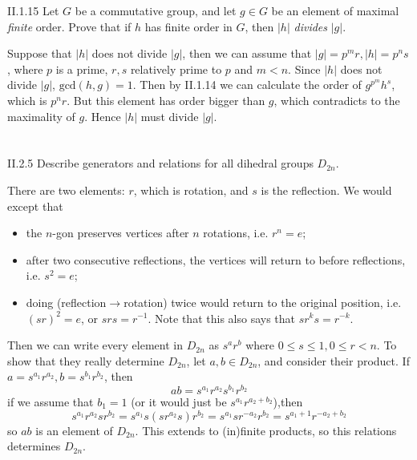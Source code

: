 \begin{problem}{II.1.15}
Let $G$ be a commutative group, and let $g\in G$ be an element of maximal \emph{finite} order. Prove that if $h$ has finite order in $G$, then $|h|$ \emph{divides} $|g|$.
\end{problem}
\begin{pf}
Suppose that $|h|$ does not divide $|g|$, then we can assume that $|g| = p^mr, |h| = p^ns$, where $p$ is a prime, $r, s$ relatively prime to $p$ and $m<n$. Since $|h|$ does not divide $|g|$, $\text{gcd}(h,g) = 1$. Then by II.1.14 we can calculate the order of $g^{p^m}h^s$, which is $p^nr$. But this element has order bigger than $g$, which contradicts to the maximality of $g$. Hence $|h|$ must divide $|g|$.
\end{pf}

\section{}

\begin{problem}{II.2.5}
Describe generators and relations for all dihedral groups $D_{2n}$.
\end{problem}
\begin{sol}
There are two elements: $r$, which is rotation, and $s$ is the  reflection. We would except that 
\begin{itemize}
\setlength\itemsep{0pt}
\item the $n$-gon preserves vertices after $n$ rotations, i.e. $r^n= e$;
\item after two consecutive reflections, the vertices will return to before reflections, i.e. $s^2 = e$;
\item doing (reflection$\to$rotation) twice would return to the original position, i.e. $(sr)^2 = e$, or $srs = r^{-1}$. Note that this also says that $sr^ks = r^{-k}$. 
\end{itemize}
Then we can write every element in $D_{2n}$ as $s^ar^b$ where $0 \leq s \leq 1, 0 \leq r < n$. To show that they really determine $D_{2n}$, let $a,b \in D_{2n}$, and consider their product. If $a = s^{a_1}r^{a_2}, b = s^{b_1}r^{b_2}$, then
\[
ab = s^{a_1}r^{a_2}s^{b_1}r^{b_2}
\]
if we assume that $b_1 = 1$ (or it would just be $s^{a_1}r^{a_2+b_2}$),then 
\[
s^{a_1}r^{a_2}sr^{b_2} = s^{a_1}s(sr^{a_2}s)r^{b_2} = s^{a_1}sr^{-a_2}r^{b_2} = s^{a_1+1}r^{-a_2+b_2}
\]
so $ab$ is an element of $D_{2n}$. This extends to (in)finite products, so this relations determines $D_{2n}$.
\end{sol}

